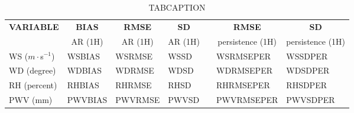 \begin{table}[]
\begin{center}
\begin{tabular}{|l|l|l|l|l|l|l|}
\hline
\multicolumn{1}{|c|}{\cellcolor[HTML]{C0C0C0}\textbf{VARIABLE}} & \multicolumn{1}{c|}{\cellcolor[HTML]{C0C0C0}\textbf{BIAS}} & \multicolumn{1}{c|}{\cellcolor[HTML]{C0C0C0}\textbf{RMSE}} & \multicolumn{1}{c|}{\cellcolor[HTML]{C0C0C0}\textbf{SD}} & & \multicolumn{1}{c|}{\cellcolor[HTML]{C0C0C0}\textbf{RMSE}} & \multicolumn{1}{c|}{\cellcolor[HTML]{C0C0C0}\textbf{SD}}\\
\multicolumn{1}{|c|}{\cellcolor[HTML]{C0C0C0}} & \multicolumn{1}{c|}{\cellcolor[HTML]{C0C0C0}AR (1H)} & \multicolumn{1}{c|}{\cellcolor[HTML]{C0C0C0}AR (1H)} & \multicolumn{1}{c|}{\cellcolor[HTML]{C0C0C0}AR (1H)} & & \multicolumn{1}{c|}{\cellcolor[HTML]{C0C0C0}persistence (1H)} & \multicolumn{1}{c|}{\cellcolor[HTML]{C0C0C0}persistence (1H)}\\\hline
\cellcolor[HTML]{C0C0C0}WS ($m\cdot$s$^{-1}$) & WSBIAS  & WSRMSE  & WSSD  & & WSRMSEPER  & WSSDPER\\
\cellcolor[HTML]{C0C0C0}WD (degree)           & WDBIAS  & WDRMSE  & WDSD  & & WDRMSEPER  & WDSDPER\\
\cellcolor[HTML]{C0C0C0}RH (percent)          & RHBIAS  & RHRMSE  & RHSD  & & RHRMSEPER  & RHSDPER\\
\cellcolor[HTML]{C0C0C0}PWV (mm)              & PWVBIAS & PWVRMSE & PWVSD & & PWVRMSEPER & PWVSDPER\\
\hline
\end{tabular}
\caption{TABCAPTION}\label{MYLABEL}
\end{center}
\end{table}

